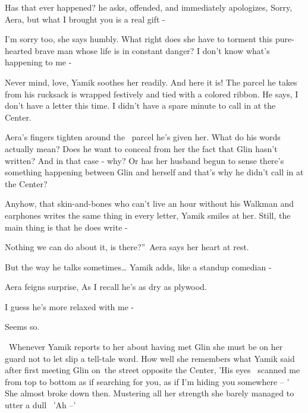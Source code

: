 \documentclass[letterpaper]{article}
\begin{document}
{\textquotedbl}Has that ever happened?{\textquotedbl} he asks, offended, and immediately apologizes,
{\textquotedbl}Sorry, Aera, but what I brought you is a real gift -{\textquotedbl} 

{\textquotedbl}I'm sorry too,{\textquotedbl} she says humbly. What right does she have to torment this pure-hearted
brave man whose life is in constant danger? {\textquotedbl}I don't know what's happening to me -{\textquotedbl} 

{\textquotedbl}Never mind, love,{\textquotedbl} Yamik soothes her readily. {\textquotedbl}And here it is!{\textquotedbl}
The parcel he takes from his rucksack is wrapped festively and tied with a colored ribbon. He says, {\textquotedbl}I
don't have a letter this time. I didn't have a spare minute to call in at the Center.{\textquotedbl} 

Aera's fingers tighten around the \ parcel he's given her. What do his words actually mean? Does he want to conceal from
her the fact that Glin hasn't written? And in that case - why? Or has her husband begun to sense there's something
happening between Glin and herself and that's why he didn't call in at the Center?

{\textquotedbl}Anyhow, that skin-and-bones who can't live an hour without his Walkman and earphones writes the same
thing in every letter, {\textquotedbl} Yamik smiles at her. {\textquotedbl}Still, the main thing is that he does write
-{\textquotedbl} 

{\textquotedbl}Nothing we can do about it, is there?''~Aera says her heart at rest.

{\textquotedbl}But the way he talks sometimes{\dots}{\textquotedbl} Yamik adds, {\textquotedbl}like a standup comedian
-{\textquotedbl} 

Aera feigns surprise, {\textquotedbl}As I recall he's as dry as plywood.{\textquotedbl}

{\textquotedbl}I guess he's more relaxed with me -{\textquotedbl} 

{\textquotedbl}Seems so.{\textquotedbl} 

\ Whenever Yamik reports to her about having met Glin she must be on her guard not to let slip a tell-tale word. How
well she remembers what Yamik said after first meeting Glin on~the street opposite the Center, 'His eyes \ scanned me
from top to bottom as if searching for you, as if I'm hiding you somewhere -- ' She almost broke down then. Mustering
all her strength she barely managed to utter a dull~ 'Ah --' 
\end{document}
